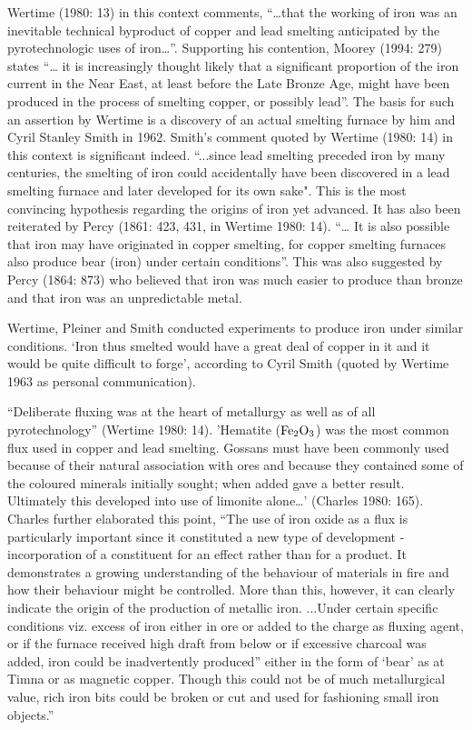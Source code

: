 Wertime (1980: 13) in this context comments, {\footnotesize“…that the working of iron was an inevitable technical byproduct of copper and lead smelting anticipated by the pyrotechnologic uses of iron…”}. Supporting his contention, Moorey (1994: 279) states “… it is increasingly thought likely that a significant proportion of the iron current in the Near East, at least before the Late Bronze Age, might have been produced in the process of smelting copper, or possibly lead”. The basis for such an assertion by Wertime is a discovery of an actual smelting furnace by him and Cyril Stanley Smith in 1962. Smith’s comment quoted by Wertime (1980: 14) in this context is significant indeed. {\footnotesize“...since lead smelting preceded iron by many centuries, the smelting of iron could accidentally have been discovered in a lead smelting furnace and later developed for its own sake"}. This is the most convincing hypothesis regarding the origins of iron yet advanced. It has also been reiterated by Percy (1861: 423, 431, in Wertime 1980: 14).  {\footnotesize “… It is also possible that iron may have originated in copper smelting, for copper smelting furnaces also produce bear (iron) under certain conditions”}. This was also suggested by Percy (1864: 873) who believed that iron was much easier to produce than bronze and that iron was an unpredictable metal.

Wertime, Pleiner and Smith conducted experiments to produce iron under similar conditions. ‘Iron thus smelted would have a great deal of copper in it and it would be quite difficult to forge’, according to Cyril Smith (quoted by Wertime 1963 as personal communication).

{\footnotesize “Deliberate fluxing was at the heart of metallurgy as well as of all pyrotechnology” (Wertime 1980: 14). 'Hematite ({$\rm Fe_{2}O_{3}$}) was the most common flux used in copper and lead smelting. Gossans must have been commonly used because of their natural association with ores and because they contained some of the coloured minerals initially sought; when added gave a better result. Ultimately this developed into use of limonite alone…' (Charles 1980: 165). Charles further elaborated this point, “The use of iron oxide as a flux is particularly important since it constituted a new type of development - incorporation of a constituent for an effect rather than for a product. It demonstrates a growing understanding of the behaviour of materials in fire and how their behaviour might be controlled. More than this, however, it can clearly indicate the origin of the production of metallic iron. ...Under certain specific conditions viz. excess of iron either in ore or added to the charge as fluxing agent, or if the furnace received high draft from below or if excessive charcoal was added, iron could be inadvertently produced” either in the form of ‘bear’ as at Timna or as magnetic copper. Though this could not be of much metallurgical value, rich iron bits could be broken or cut and used for fashioning small iron objects.”}

